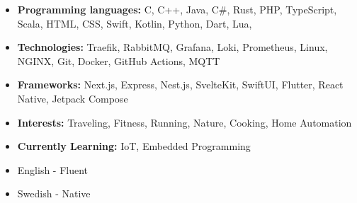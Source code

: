 







\begin{itemize}
\item \textbf{Programming languages:} C, C++, Java, C\#, Rust, PHP, TypeScript, Scala, HTML, CSS, Swift, Kotlin, Python, Dart, Lua, 
\item \textbf{Technologies:} Traefik, RabbitMQ, Grafana, Loki, Prometheus, Linux, NGINX, Git, Docker, GitHub Actions, MQTT
\item \textbf{Frameworks:} Next.js, Express, Nest.js, SvelteKit, SwiftUI, Flutter, React Native, Jetpack Compose
\item \textbf{Interests:} Traveling, Fitness, Running, Nature, Cooking, Home Automation
\item \textbf{Currently Learning:} IoT, Embedded Programming
\end{itemize}

\begin{itemize}
    \item English - Fluent
    \item Swedish - Native
\end{itemize}



